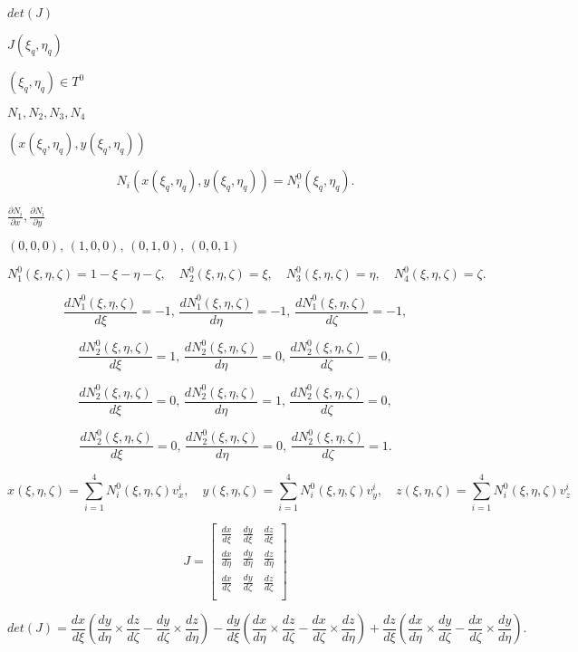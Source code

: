 \documentclass{article}
\begin{document}
$ det(J) $
\pagebreak

$ J(\xi_q,
\eta_q)$
\pagebreak

$ (\xi_q, \eta_q)
\in T^0 $
\pagebreak

$ N_1, N_2, N_3, N_4$
\pagebreak

$ (x(\xi_q, \eta_q), y(\xi_q,\eta_q)) $
\pagebreak

\[ N_i(x(\xi_q, \eta_q), y(\xi_q, \eta_q)) = N^0_i(\xi_q, \eta_q). \]
\pagebreak

$ \frac{\partial
N_i}{\partial x}, \frac{\partial N_i}{\partial y}$
\pagebreak

$ (0,0,0), \, (1,0,0), \, (0,1,0), \, (0,0,1) $
\pagebreak

\[N^0_1(\xi, \eta, \zeta) = 1- \xi - \eta - \zeta, \quad N^0_2(\xi, \eta, \zeta) = \xi,
\quad
N^0_3(\xi, \eta, \zeta) = \eta, \quad N^0_4(\xi, \eta, \zeta) = \zeta. \]
\pagebreak

\[\frac{d N^0_1(\xi, \eta, \zeta)}{d\xi} = -1, \, \frac{d N^0_1(\xi, \eta, \zeta)
}{d\eta} = -1, \, \frac{d N^0_1(\xi, \eta, \zeta)
}{d\zeta} = -1, \]
\pagebreak

\[\frac{d N^0_2(\xi, \eta, \zeta)}{d\xi} = 1, \, \frac{d N^0_2(\xi, \eta, \zeta)}{d\eta}
= 0, \, \frac{d N^0_2(\xi, \eta, \zeta)}{d\zeta}
= 0, \]
\pagebreak

\[\frac{d N^0_2(\xi, \eta, \zeta)}{d\xi} = 0, \, \frac{d N^0_2(\xi, \eta,
\zeta)}{d\eta}
= 1, \, \frac{d N^0_2(\xi, \eta, \zeta)}{d\zeta}
= 0, \]
\pagebreak

\[\frac{d N^0_2(\xi, \eta, \zeta)}{d\xi} = 0, \, \frac{d N^0_2(\xi, \eta,
\zeta)}{d\eta}
= 0, \, \frac{d N^0_2(\xi, \eta, \zeta)}{d\zeta}
= 1. \]
\pagebreak

\[ x(\xi, \eta, \zeta) = \sum_{i=1}^4 N^0_i(\xi, \eta, \zeta) v^i_x, \quad y
(\xi, \eta, \zeta)
= \sum_{i=1}^4 N^0_i(\xi, \eta, \zeta) v^i_y, \quad z
(\xi, \eta, \zeta)
= \sum_{i=1}^4 N^0_i(\xi, \eta, \zeta) v^i_z \]
\pagebreak

\[ J = \left[ {
\begin{array}{ccc}
\frac{dx}{d\xi} &\frac{dy}{d\xi} &\frac{dz}{d\xi} \\
\frac{dx}{d\eta} & \frac{dy}{d\eta} &\frac{dz}{d\eta} \\
\frac{dx}{d\zeta} & \frac{dy}{d\zeta} &\frac{dz}{d\zeta} \\
\end{array}
} \right] \]
\pagebreak

\[ det(J) = \frac{dx}{d\xi} (\frac{dy}{d\eta} \times \frac{dz}{d\zeta} -
\frac{dy}{d\zeta}\times \frac{dz}{d\eta}) - \frac{dy}{d\xi}
(\frac{dx}{d\eta} \times \frac{dz}{d\zeta} -
\frac{dx}{d\zeta}\times \frac{dz}{d\eta}) + \frac{dz}{d\xi}
(\frac{dx}{d\eta} \times \frac{dy}{d\zeta} -
\frac{dx}{d\zeta}\times \frac{dy}{d\eta}). \]
\pagebreak
\end{document}
